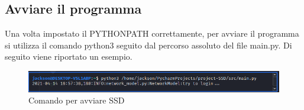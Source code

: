 \subsection{Avviare il programma}
Una volta impostato il PYTHONPATH correttamente, per avviare il programma si utilizza il comando python3 seguito dal percorso assoluto del file main.py. Di seguito viene riportato un esempio.
\begin{figure}[H]
    \centering
    \includegraphics[scale = 0.50]{components/img/avvio.png}
    \caption{Comando per avviare SSD}
    \label{fig:comando per impostare PYTHONPATH su windows}
\end{figure}